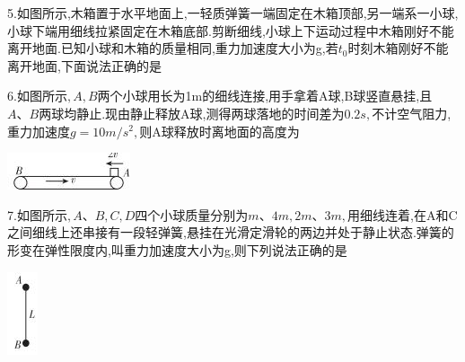 \question[6]5.如图所示,木箱置于水平地面上,一轻质弹簧一端固定在木箱顶部,另一端系一小球,小球下端用细线拉紧固定在木箱底部.剪断细线,小球上下运动过程中木箱刚好不能离开地面.已知小球和木箱的质量相同,重力加速度大小为g,若$t_0$时刻木箱刚好不能离开地面,下面说法正确的是
\begin{solution}{4cm}

\end{solution}



\question[6]6.如图所示$,A,B$两个小球用长为1m的细线连接,用手拿着A球,B球竖直悬挂,且$A、B$两球均静止.现由静止释放A球,测得两球落地的时间差为$0.2s,$不计空气阻力,重力加速度$g=10m/s^2,$则A球释放时离地面的高度为
\begin{center}
\includegraphics[]{img/image6.jpeg}
\end{center}

\begin{solution}{4cm}

\end{solution}



\question[6]7.如图所示$,A、B,C,D$四个小球质量分别为$m、4m,2m、3m,$用细线连着,在A和C之间细线上还串接有一段轻弹簧,悬挂在光滑定滑轮的两边并处于静止状态.弹簧的形变在弹性限度内,叫重力加速度大小为g,则下列说法正确的是
\begin{center}
\includegraphics[]{img/image7.jpeg}
\end{center}

\begin{solution}{4cm}

\end{solution}



